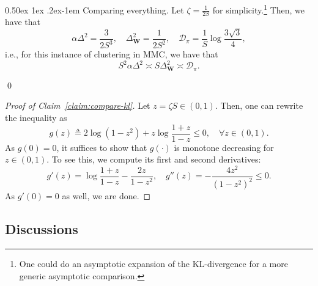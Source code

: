 \documentclass[twoside]{article}
\makeatletter
\renewcommand{\paragraph}{%
  \@startsection{paragraph}{4}%
  {\z@}{0.50ex \@plus 1ex \@minus .2ex}{-1em}%
  {\normalfont\normalsize\bfseries}%
}
\def\mW{{\bm{W}}}
\def\gD{{\mathcal{D}}}
\theoremstyle{plain}
\makeatother
\begin{document}
\paragraph{Comparing everything.}
Let $\zeta = \frac{1}{2S}$ for simplicity.\footnote{One could do an asymptotic expansion of the KL-divergence for a more generic asymptotic comparison.}
Then, we have that
\begin{equation*}
    \alpha \Delta^2 = \frac{3}{2 S^3}, \quad \Delta_\mW^2 = \frac{1}{2 S^2}, \quad \gD_\pi = \frac{1}{S} \log\frac{3 \sqrt{3}}{4},
\end{equation*}
i.e., for this instance of clustering in MMC, we have that
\begin{equation}
    S^2 \alpha \Delta^2 \asymp S \Delta_\mW^2 \asymp \gD_\pi.
\end{equation}

\qed

\begin{proof}[Proof of Claim~\ref{claim:compare-kl}]
    Let $z = \zeta S \in (0, 1)$.
    Then, one can rewrite the inequality as
    \begin{equation*}
        g(z) \triangleq 2 \log(1 - z^2) + z \log\frac{1 + z}{1 - z} \leq 0, \quad \forall z \in (0, 1).
    \end{equation*}
    As $g(0) = 0$, it suffices to show that $g(\cdot)$ is monotone decreasing for $z \in (0, 1)$.
    To see this, we compute its first and second derivatives:
    \begin{equation*}
        g'(z) = \log\frac{1 + z}{1 - z} - \frac{2z}{1 - z^2}, \quad g''(z) = - \frac{4z^2}{(1 - z^2)^2} \leq 0.
    \end{equation*}
    As $g'(0) = 0$ as well, we are done.
\end{proof}


\subsection{Discussions}
\end{document}
